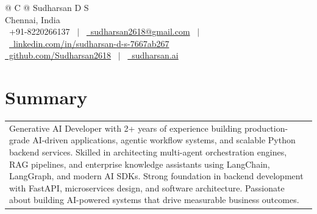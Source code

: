 \documentclass[a4paper,1pt]{article}
\begin{document}
\pagestyle{empty} 


\begin{tabularx}{\linewidth}{@{} C @{}}
\Huge{Sudharsan D S} \\[5pt]
Chennai, India \\[3pt]
\raisebox{-0.05\height}\faMobile \ +91-8220266137 \ $|$ \ 
\href{mailto:sudharsan2618@gmail.com}{\raisebox{-0.05\height}\faEnvelope \ sudharsan2618@gmail.com} \ $|$ \ 
\href{https://www.linkedin.com/in/sudharsan-d-s-7667ab267/}{\raisebox{-0.05\height}\faLinkedin\ linkedin.com/in/sudharsan-d-s-7667ab267} \\[2pt]
\href{https://github.com/Sudharsan2618}{\raisebox{-0.05\height}\faGithub\ github.com/Sudharsan2618} \ $|$ \ 
\href{https://sudharsan2618.github.io/sudharsan-portfolio/}{\raisebox{-0.05\height}\faGlobe \ sudharsan.ai} \\
\end{tabularx}

\section{Summary}
\begin{tabularx}{\linewidth}{@{}X@{}}
Generative AI Developer with 2+ years of experience building production-grade AI-driven applications, agentic workflow systems, and scalable Python backend services. Skilled in architecting multi-agent orchestration engines, RAG pipelines, and enterprise knowledge assistants using LangChain, LangGraph, and modern AI SDKs. Strong foundation in backend development with FastAPI, microservices design, and software architecture. Passionate about building AI-powered systems that drive measurable business outcomes.
\end{tabularx}

\end{document}
